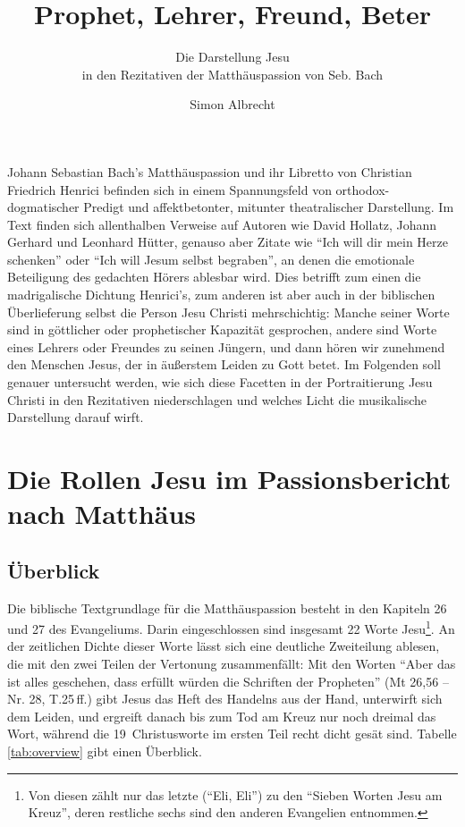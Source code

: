 \documentclass[a4paper,11pt,twoside]{scrartcl}
\title{Prophet, Lehrer, Freund, Beter}
\subtitle{Die Darstellung Jesu\\in den Rezitativen der Matthäuspassion von Seb. Bach}
\author{Simon Albrecht}
\begin{document}
\maketitle

Johann Sebastian Bach’s Matthäuspassion und ihr Libretto von
Christian Friedrich Henrici befinden sich in einem Spannungsfeld
von orthodox-dogmatischer Predigt und affektbetonter, mitunter
theatralischer Darstellung.  Im Text finden sich allenthalben
Verweise auf Autoren wie David Hollatz, Johann Gerhard und Leonhard
Hütter, genauso aber Zitate wie \enquote{Ich will dir mein Herze
schenken} oder \enquote{Ich will Jesum selbst begraben}, an denen
die emotionale Beteiligung des gedachten Hörers ablesbar wird.  Dies
betrifft zum einen die madrigalische Dichtung Henrici’s, zum anderen
ist aber auch in der biblischen Überlieferung selbst die Person Jesu
Christi mehrschichtig: Manche seiner Worte sind in göttlicher oder
prophetischer Kapazität gesprochen, andere sind Worte eines Lehrers
oder Freundes zu seinen Jüngern, und dann hören wir zunehmend den
Menschen Jesus, der in äußerstem Leiden zu Gott betet.  Im Folgenden
soll genauer untersucht werden, wie sich diese Facetten in der
Portraitierung Jesu Christi in den Rezitativen niederschlagen und
welches Licht die musikalische Darstellung darauf wirft.

\section{Die Rollen Jesu im Passionsbericht nach Matthäus}

\subsection{Überblick}

Die biblische Textgrundlage für die Matthäuspassion besteht in den
Kapiteln 26 und 27 des Evangeliums.  Darin eingeschlossen sind insgesamt
22 Worte Jesu\footnote{Von diesen zählt nur das letzte (\enquote{Eli,
Eli}) zu den \enquote{Sieben Worten Jesu am Kreuz}, deren restliche sechs
sind den anderen Evangelien entnommen.}.  An der zeitlichen
Dichte dieser Worte lässt sich eine deutliche Zweiteilung ablesen,
die mit den zwei Teilen der Vertonung zusammenfällt: Mit den Worten
\enquote{Aber das ist alles geschehen, dass erfüllt würden die Schriften
der Propheten} (Mt 26,56 – Nr. 28, T.25\,ff.) gibt Jesus das Heft
des Handelns aus der Hand, unterwirft sich dem Leiden, und ergreift
danach bis zum Tod am Kreuz nur noch dreimal das Wort, während die
19~Christusworte im ersten Teil recht dicht gesät sind.  Tabelle
\vref{tab:overview} gibt einen Überblick.
\end{document}
